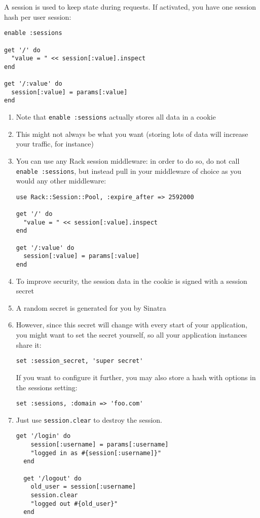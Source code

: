 
A session is used to keep state during requests. If activated, you
have one session hash per user session:

\begin{verbatim}
enable :sessions

get '/' do
  "value = " << session[:value].inspect
end

get '/:value' do
  session[:value] = params[:value]
end
\end{verbatim}
\begin{enumerate}
\item 
Note that \verb|enable :sessions| actually stores all data in a cookie
\item   This might not always be what you want (storing lots of data will increase your traffic, for instance)
\item  You can use any Rack session middleware: in order to do so, do not call \verb|enable :sessions|, but instead pull in your middleware of choice as you would any other middleware:

\begin{verbatim}
use Rack::Session::Pool, :expire_after => 2592000

get '/' do
  "value = " << session[:value].inspect
end

get '/:value' do
  session[:value] = params[:value]
end
\end{verbatim}
\item 
To improve security, the session data in the cookie is signed with a session secret
\item  A random secret is generated for you by Sinatra
\item  However, since this secret will change with every start of your application, you might want to set the secret yourself, so all your application instances share it:
\begin{verbatim}
set :session_secret, 'super secret'
\end{verbatim}
If you want to configure it further, you may also store a hash with options in the sessions setting:
\begin{verbatim}
set :sessions, :domain => 'foo.com'
\end{verbatim}
\item 
Just use
\verb|session.clear| to destroy the session.
\begin{verbatim}
get '/login' do
    session[:username] = params[:username]
    "logged in as #{session[:username]}"
  end

  get '/logout' do
    old_user = session[:username]
    session.clear
    "logged out #{old_user}"
  end
\end{verbatim}
\end{enumerate}


